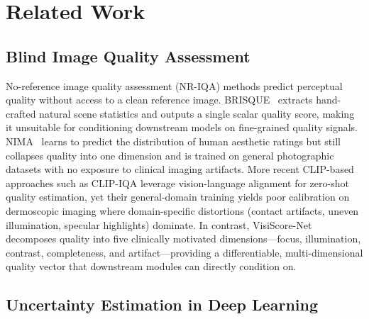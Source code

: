 
\section{Related Work}
\label{sec:related}


\subsection{Blind Image Quality Assessment}
\label{sec:related:iqa}

No-reference image quality assessment (NR-IQA) methods predict perceptual quality without access to a clean reference image.
BRISQUE~\cite{mittal2012making} extracts hand-crafted natural scene statistics and outputs a single scalar quality score, making it unsuitable for conditioning downstream models on fine-grained quality signals.
NIMA~\cite{talebi2018nima} learns to predict the distribution of human aesthetic ratings but still collapses quality into one dimension and is trained on general photographic datasets with no exposure to clinical imaging artifacts.
More recent CLIP-based approaches such as CLIP-IQA leverage vision-language alignment for zero-shot quality estimation, yet their general-domain training yields poor calibration on dermoscopic imaging where domain-specific distortions (contact artifacts, uneven illumination, specular highlights) dominate.
In contrast, VisiScore-Net decomposes quality into five clinically motivated dimensions—focus, illumination, contrast, completeness, and artifact—providing a differentiable, multi-dimensional quality vector that downstream modules can directly condition on.

\subsection{Uncertainty Estimation in Deep Learning}
\label{sec:related:uncertainty}

